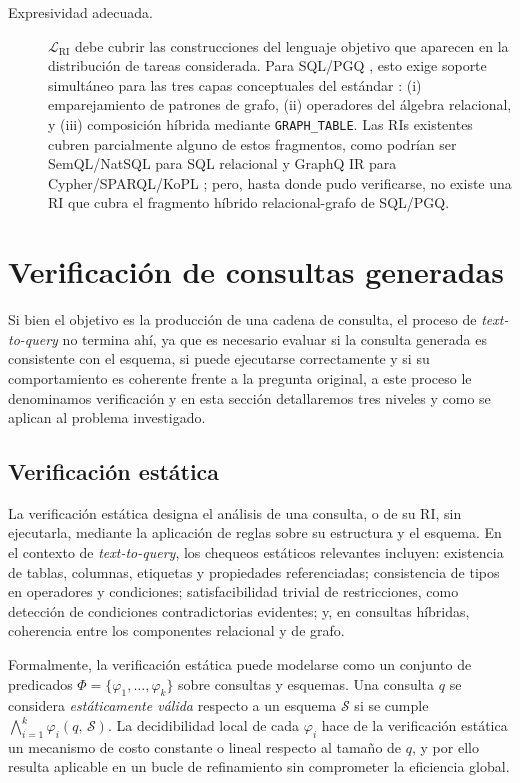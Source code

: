 \begin{description}
\item[Expresividad adecuada.] $\mathcal{L}_{\mathrm{RI}}$ debe cubrir las construcciones del lenguaje objetivo que aparecen en la distribución de tareas considerada. Para SQL/PGQ \cite{deutsch2022graph}, esto exige soporte simultáneo para las tres capas conceptuales del estándar \cite{bonifati2025expressiveness}: (i) emparejamiento de patrones de grafo, (ii) operadores del álgebra relacional, y (iii) composición híbrida mediante \texttt{GRAPH\_TABLE}. Las \acp{RI} existentes cubren parcialmente alguno de estos fragmentos, como podrían ser SemQL/NatSQL para SQL relacional \cite{guo2019irnet,gan2021natsql}y GraphQ IR para Cypher/SPARQL/KoPL \cite{nie2022graphqir}; pero, hasta donde pudo verificarse, no existe una \ac{RI} que cubra el fragmento híbrido relacional-grafo de SQL/PGQ.
\end{description}

\section{Verificación de consultas generadas}
\label{sec:verificacion}

Si bien el objetivo es la producción de una cadena de consulta, el proceso de \emph{text-to-query} no termina ahí, ya que es necesario evaluar si la consulta generada es consistente con el esquema, si puede ejecutarse correctamente y si su comportamiento es coherente frente a la pregunta original, a este proceso le denominamos verificación y en esta sección detallaremos tres niveles y como se aplican al problema investigado.

\subsection{Verificación estática}

La verificación estática designa el análisis de una consulta, o de su \ac{RI}, sin ejecutarla, mediante la aplicación de reglas sobre su estructura y el esquema. En el contexto de \emph{text-to-query}, los chequeos estáticos relevantes incluyen: existencia de tablas, columnas, etiquetas y propiedades referenciadas; consistencia de tipos en operadores y condiciones; satisfacibilidad trivial de restricciones, como detección de condiciones contradictorias evidentes; y, en consultas híbridas, coherencia entre los componentes relacional y de grafo.

Formalmente, la verificación estática puede modelarse como un conjunto de predicados $\Phi = \{\varphi_1, \ldots, \varphi_k\}$ sobre consultas y esquemas. Una consulta $q$ se considera \emph{estáticamente válida} respecto a un esquema $\mathcal{S}$ si se cumple $\bigwedge_{i=1}^{k} \varphi_i(q,\, \mathcal{S})$. La decidibilidad local de cada $\varphi_i$ hace de la verificación estática un mecanismo de costo constante o lineal respecto al tamaño de $q$, y por ello resulta aplicable en un bucle de refinamiento sin comprometer la eficiencia global.

